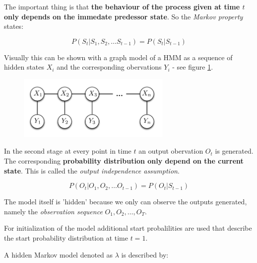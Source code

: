 The important thing is that \textbf{the behaviour of the process given at time $t$ only depends on the immedate predessor state}. So the \emph{Markov property} states:

\begin{equation}
	P(S_t | S_1,S_2, \ldots S_{t-1}) = P(S_t | S_{t-1})
\end{equation}

Visually this can be shown with a graph model of a HMM as a sequence of hidden states $X_i$ and the corresponding obervations $Y_i$ - see figure \ref{fig:GraphModel}.

\begin{figure}[H]
	\centering
	
	\includegraphics[width=0.66\textwidth]{./Images/GraphModelHMM_1.png}
	\caption{ \cite{hmm_II}}
	\label{fig:GraphModel}
\end{figure}

In the second stage at every point in time $t$ an output obervation $O_t$ is generated. The corresponding \textbf{probability distribution only depend on the current state}. This is called the \emph{output independence assumption}.

\begin{equation}
P(O_t | O_1,O_2, \ldots O_{t-1}) = P(O_t | S_{t-1})
\end{equation} 

The model itself is 'hidden' because we only can observe the outputs generated, namely the \emph{observation sequence} $O_1, O_2, \ldots,  O_T$.

For initialization of the model additional start probalilities are used that describe the start probability distribution at time $t=1$.

A hidden Markov model denoted as $\lambda$ is described by:

